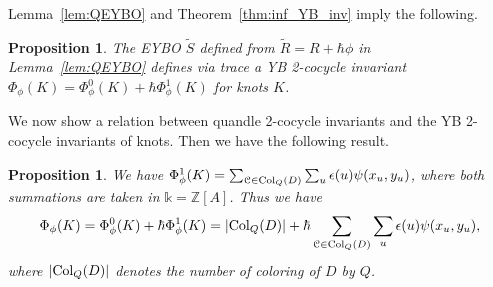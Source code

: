 \documentclass[11pt,fleqn]{amsart} %
\newcommand\Z{{\mathbb Z}}
\newtheorem{proposition}[theorem]{Proposition}
\begin{document}
Lemma~\ref{lem:QEYBO} and Theorem~\ref{thm:inf_YB_inv} imply the following.

\begin{proposition} \label{prop:QtoYB}
The EYBO $\tilde S$ defined
from $\tilde R=R + \hbar \phi$  in Lemma~\ref{lem:QEYBO}
			 defines  via trace a YB 2-cocycle invariant 
			$\Phi_\phi (K) = \Phi_\phi^0 (K) + \hbar \Phi_\phi^1 (K)$ for knots $K$. 
			\end{proposition}
			
			
We now show a relation between quandle 2-cocycle invariants and the YB 2-cocycle invariants of knots. Then we have the following result.


\begin{proposition}\label{pro:quandle_quantum}
We have 
$ \Phi^1_\phi (K) = \sum_{\mathcal C  \in {\rm Col}_Q(D)} \sum_u \epsilon(u) \psi(x_u, y_u) $,
where both summations are  taken in $\mathbb k=\Z [A]$. Thus we have
$$ \Phi_\phi (K) = \Phi_\phi^0 (K) + \hbar \Phi_\phi^1 (K)
= | {\rm Col}_Q(D) | + \hbar  \sum_{\mathcal C  \in {\rm Col}_Q(D)} \sum_u \epsilon(u) \psi(x_u, y_u) , $$
where $ | {\rm Col}_Q(D) | $ denotes the number of coloring of $D$ by $Q$.
\end{proposition}
\end{document}
